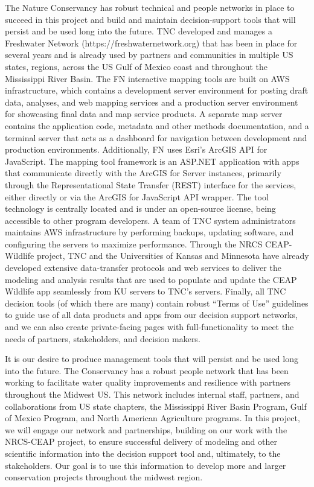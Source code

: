 \documentclass[12pt, class=article, crop=false]{standalone}
\begin{document}
The Nature Conservancy has robust technical and people networks in place to succeed in this project and build and maintain decision-support tools that will persist and be used long into the future.
TNC developed and manages a Freshwater Network (https://freshwaternetwork.org) that has been in place for several years and is already used by partners and communities in multiple US states, regions, across the US Gulf of Mexico coast and throughout the Mississippi River Basin.
The FN interactive mapping tools are built on AWS infrastructure, which contains a development server environment for posting draft data, analyses, and web mapping services and a production server environment for showcasing final data and map service products.
A separate map server contains the application code, metadata and other methods documentation, and a terminal server that acts as a dashboard for navigation between development and production environments.
Additionally, FN uses Esri's ArcGIS API for JavaScript. The mapping tool framework is an ASP.NET application with apps that communicate directly with the ArcGIS for Server instances, primarily through the Representational State Transfer (REST) interface for the services, either directly or via the ArcGIS for JavaScript API wrapper.
The tool technology is centrally located and is under an open-source license, being accessible to other program developers.
A team of TNC system administrators maintains AWS infrastructure by performing backups, updating software, and configuring the servers to maximize performance.
Through the NRCS CEAP-Wildlife project, TNC and the Universities of Kansas and Minnesota have already developed extensive data-transfer protocols and web services to deliver the modeling and analysis results that are used to populate and update the CEAP Wildlife app seamlessly from KU servers to TNC’s servers.
Finally, all TNC decision tools (of which there are many) contain robust “Terms of Use” guidelines to guide use of all data products and apps from our decision support networks, and we can also create private-facing pages with full-functionality to meet the needs of partners, stakeholders, and decision makers.

It is our desire to produce management tools that will persist and be used long into the future.
The Conservancy has a robust people network that has been working to facilitate water quality improvements and resilience with partners throughout the Midwest US.
This network includes internal staff, partners, and collaborations from US state chapters, the Mississippi River Basin Program, Gulf of Mexico Program, and North American Agriculture programs.
In this project, we will engage our network and partnerships, building on our work with the NRCS-CEAP project, to ensure successful delivery of modeling and other scientific information into the decision support tool and, ultimately, to the stakeholders.
Our goal is to use this information to develop more and larger conservation projects throughout the midwest region. 
\end{document}
